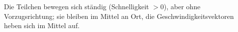Die Teilchen bewegen sich ständig (Schnelligkeit $> 0$), aber ohne Vorzugsrichtung; sie bleiben im Mittel an Ort, die Geschwindigkeitsvektoren heben sich im Mittel auf.
